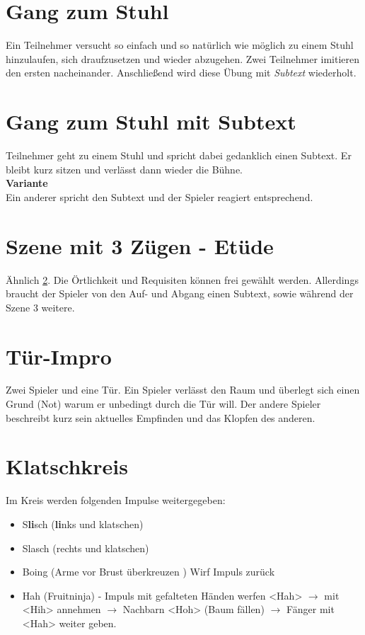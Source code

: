 \documentclass[ngerman, a4paper, twoside]{scrbook}%
\begin{document}
	\section{Gang zum Stuhl}
	Ein Teilnehmer versucht so einfach und so natürlich wie möglich zu einem Stuhl hinzulaufen, sich draufzusetzen und wieder abzugehen. Zwei Teilnehmer imitieren den ersten nacheinander. Anschließend wird diese Übung mit \emph{Subtext} wiederholt.
	\section{Gang zum Stuhl mit Subtext}\label{Gang zum Stuhl mit Subtext}
	Teilnehmer geht zu einem Stuhl und spricht dabei gedanklich einen Subtext. Er bleibt kurz sitzen und verlässt dann wieder die Bühne. \vspace{.4cm}\\
	\textbf{Variante} \vspace{.2cm}\\
	Ein anderer spricht den Subtext und der Spieler reagiert entsprechend.
	\section{Szene mit 3 Zügen - Etüde}
	Ähnlich \ref{Gang zum Stuhl mit Subtext}. Die Örtlichkeit und Requisiten können frei gewählt werden. Allerdings braucht der Spieler von den Auf- und Abgang einen Subtext, sowie während der Szene 3 weitere.
	\section{Tür-Impro}
	Zwei Spieler und eine Tür. Ein Spieler verlässt den Raum und überlegt sich einen Grund (Not) warum er unbedingt durch die Tür will. Der andere Spieler beschreibt kurz sein aktuelles Empfinden und das Klopfen des anderen.
	\section{Klatschkreis}
	Im Kreis werden folgenden Impulse weitergegeben:
	\begin{itemize}
		\item S\textbf{li}sch (\textbf{li}nks und klatschen)
		\item Slasch (rechts und klatschen)
		\item Boing (Arme vor Brust überkreuzen ) Wirf Impuls zurück
		\item Hah (Fruitninja) - Impuls mit gefalteten Händen werfen <Hah> $\rightarrow$ mit <Hih> annehmen $\rightarrow$ Nachbarn <Hoh> (Baum fällen) $\rightarrow$ Fänger mit <Hah> weiter geben.
	\end{itemize}
\end{document}
